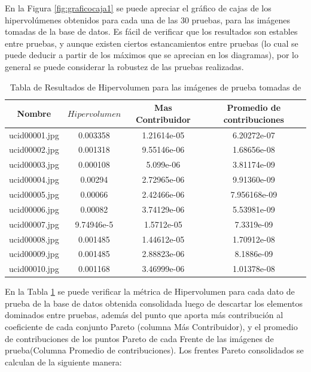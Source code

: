 En la Figura \ref{fig:graficocaja1} se puede apreciar el gráfico de cajas de los hipervolúmenes obtenidos para cada una de las 30 pruebas, para las imágenes tomadas de la base de datos. Es fácil de verificar que los resultados son estables entre pruebas, y aunque existen ciertos estancamientos entre pruebas (lo cual se puede deducir a partir de los máximos que se aprecian en los diagramas), por lo general se puede considerar la robustez de las pruebas realizadas.

\begin{table}[H]
\setlength{\abovecaptionskip}{2pt plus 3pt minus 2pt} %
\caption[Parámetros de entrada para $MOPSO$]{Tabla de Resultados de Hipervolumen para las imágenes de prueba tomadas de \cite{schaefer2003ucid}}
\begin{center}
 \begin{tabular}{||c | c c c||} 
 \hline
Nombre & $Hipervolumen$ & Mas Contribuidor & Promedio de contribuciones \\ 
\hline
ucid00001.jpg & 0.003358  & 1.21614e-05 & 6.20272e-07\\ 
\hline
ucid00002.jpg & 0.001318 & 9.55146e-06  & 1.68656e-08  \\ 
ucid00003.jpg & 0.000108 & 5.099e-06   & 3.81174e-09  \\ 
\hline
ucid00004.jpg & 0.00294 & 2.72965e-06   & 9.91360e-09  \\ 
\hline
ucid00005.jpg & 0.00066 & 2.42466e-06   & 7.956168e-09  \\ 
\hline
ucid00006.jpg & 0.00082 & 3.74129e-06   & 5.53981e-09  \\ 
\hline
ucid00007.jpg & 9.74946e-5 & 1.5712e-05   & 7.3319e-09  \\ 
\hline
ucid00008.jpg & 0.001485 & 1.44612e-05   & 1.70912e-08  \\ 
\hline
ucid00009.jpg & 0.001485 & 2.88823e-06   & 8.1886e-09  \\ 
\hline
ucid00010.jpg & 0.001168 & 3.46999e-06   & 1.01378e-08  \\ 
\hline
\hline
\end{tabular}
\end{center}
\label{table:hipervolumen}
\end{table}

En la Tabla \ref{table:hipervolumen} se puede verificar la métrica de Hipervolumen para cada dato de prueba de la base de datos obtenida consolidada luego de descartar los elementos dominados entre pruebas, además del punto que aporta más contribución al coeficiente de cada conjunto Pareto (columna Más Contribuidor), y el promedio de contribuciones de los puntos Pareto de cada Frente de las imágenes de prueba(Columna Promedio de contribuciones). Los frentes Pareto consolidados se calculan de la siguiente manera:


